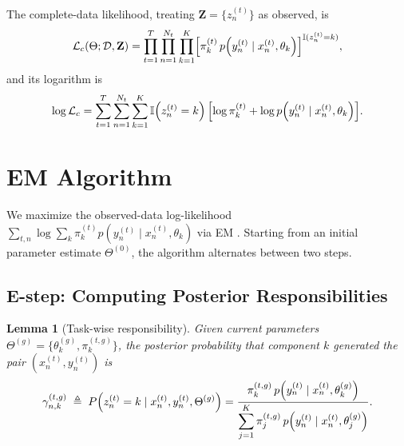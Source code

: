 \documentclass[preprint,12pt]{elsarticle}
\newtheorem{lemma}{Lemma}
\begin{document}
	The complete-data likelihood, treating $\mathbf{Z} = \{z_n^{(t)}\}$ as
	observed, is
	\begin{equation}
		\mathcal{L}_c(\Theta;\mathcal{D},\mathbf{Z})
		= \prod_{t=1}^T \prod_{n=1}^{N_t} \prod_{k=1}^K
		\Bigl[\pi_k^{(t)}\,
		p\!\left(y_n^{(t)}\mid x_n^{(t)},\theta_k\right)\Bigr]^{
			\mathbb{I}(z_n^{(t)}=k)},
		\label{eq:complete_likelihood}
	\end{equation}
	and its logarithm is
	\begin{equation}
		\log \mathcal{L}_c
		= \sum_{t=1}^T \sum_{n=1}^{N_t} \sum_{k=1}^K
		\mathbb{I}\!\left(z_n^{(t)}=k\right)
		\Bigl[\log\pi_k^{(t)}
		+ \log p\!\left(y_n^{(t)}\mid x_n^{(t)},\theta_k\right)\Bigr].
		\label{eq:complete_loglik}
	\end{equation}
	
	\section{EM Algorithm}
	\label{sec:em}
	
	We maximize the observed-data log-likelihood
	$\sum_{t,n} \log \sum_k \pi_k^{(t)} p(y_n^{(t)} \mid x_n^{(t)},\theta_k)$
	via EM \citep{dempster1977maximum}. Starting from an initial parameter
	estimate $\Theta^{(0)}$, the algorithm alternates between two steps.
	
	\subsection{E-step: Computing Posterior Responsibilities}
	
	\begin{lemma}[Task-wise responsibility]
		\label{lem:estep}
		Given current parameters
		$\Theta^{(g)} = \{\theta_k^{(g)}, \pi_k^{(t,g)}\}$,
		the posterior probability that component $k$ generated the pair
		$(x_n^{(t)}, y_n^{(t)})$ is
		\begin{equation}
			\gamma_{n,k}^{(t,g)}
			\;\triangleq\;
			P\!\left(z_n^{(t)}=k \mid x_n^{(t)}, y_n^{(t)}, \Theta^{(g)}\right)
			= \frac{\pi_k^{(t,g)}\,
				p\!\left(y_n^{(t)}\mid x_n^{(t)},\theta_k^{(g)}\right)}{%
				\displaystyle\sum_{j=1}^K
				\pi_j^{(t,g)}\,
				p\!\left(y_n^{(t)}\mid x_n^{(t)},\theta_j^{(g)}\right)}.
			\label{eq:estep}
		\end{equation}
	\end{lemma}
	
\end{document}

